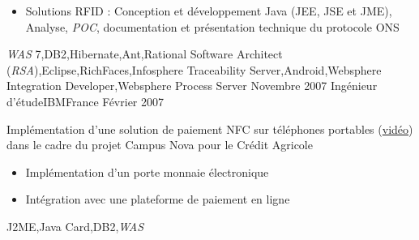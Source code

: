 \begin{experiences}
{\begin{itemize}
                        \item Solutions RFID : Conception et développement Java (JEE, JSE et JME), Analyse, \emph{POC}, documentation et présentation technique du protocole ONS
                      \end{itemize}
                    }
                    {\emph{WAS} 7,DB2,Hibernate,Ant,Rational Software Architect (\emph{RSA}),Eclipse,RichFaces,Infosphere Traceability Server,Android,Websphere Integration Developer,Websphere Process Server}
  \emptySeparator         
  \experience
  {Novembre 2007}  {Ingénieur d'étude}{IBM}{France}
  {Février 2007}   {
                      Implémentation d'une solution de paiement NFC sur téléphones portables (\href{http://www.nouvo.ch/s-007}{vidéo}) 
                      dans le cadre du projet Campus Nova pour le Crédit Agricole  
                      \begin{itemize}
                        \item Implémentation d'un porte monnaie électronique                                            
                        \item Intégration avec une plateforme de paiement en ligne  
                      \end{itemize}
                  }
                  {J2ME,Java Card,DB2,\emph{WAS}}  
\end{experiences}
